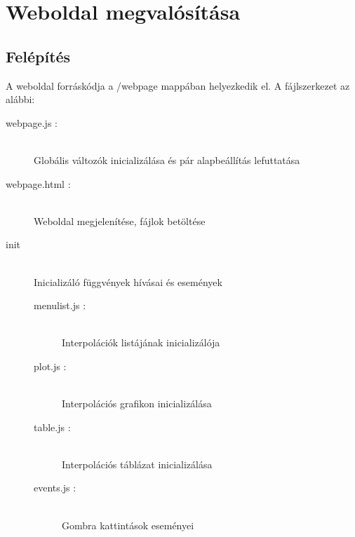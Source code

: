 \section{Weboldal megvalósítása}
\subsection{Felépítés}
	A weboldal forráskódja a /webpage mappában helyezkedik el. 
	A fájlszerkezet az alábbi:
	\begin{description}
		\item[webpage.js :] \hfill \\  
		Globális változók inicializálása és pár alapbeállítás lefuttatása
		
		\item[webpage.html :]  \hfill \\ 
		Weboldal megjelenítése, fájlok betöltése
		
		\item[init] \hfill \\ 
		Inicializáló függvények hívásai és események
		\begin{description}
			\item[menulist.js : ] \hfill \\ 
				Interpolációk listájának inicializálója
		  	\item[plot.js : ] \hfill \\ 
		  		Interpolációs grafikon inicializálása
			\item[table.js : ] \hfill \\ 
				Interpolációs táblázat inicializálása
		 	\item[events.js : ] \hfill \\ 
		 		Gombra kattintások eseményei
		\end{description}


\end{description}
